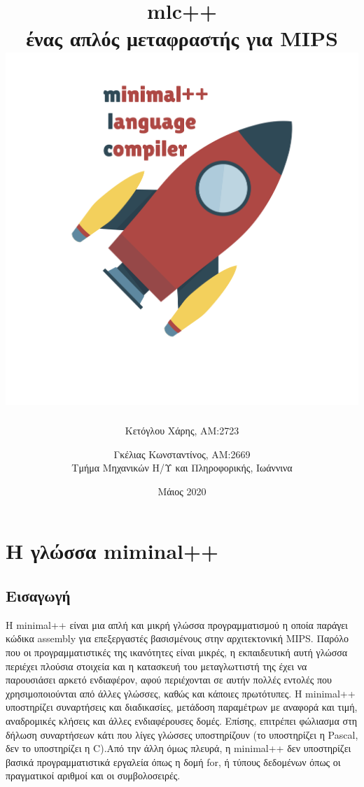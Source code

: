 \documentclass[12pt,a4paper,a4paper]{report}
\begin{document}
\title{mlc++\\ ένας απλός μεταφραστής για MIPS \\ \includegraphics[scale=0.3]{logo}}
\author{Κετόγλου Χάρης, ΑΜ:2723 \and Γκέλιας Κωνσταντίνος, ΑΜ:2669 \\{Τμήμα Μηχανικών Η/Υ και Πληροφορικής, Ιωάννινα}}
\date{Μάιος 2020}
\maketitle
\tableofcontents

\chapter{Η γλώσσα miminal++}

\section{Εισαγωγή}
Η minimal++ είναι μια απλή και μικρή γλώσσα προγραμματισμού η οποία παράγει κώδικα assembly για επεξεργαστές βασισμένους στην αρχιτεκτονική MIPS. Παρόλο που οι προγραμματιστικές της ικανότητες είναι μικρές, η εκπαιδευτική αυτή γλώσσα περιέχει πλούσια στοιχεία και η κατασκευή του μεταγλωττιστή της έχει να παρουσιάσει αρκετό ενδιαφέρον, αφού περιέχονται σε αυτήν πολλές εντολές που χρησιμοποιούνται από άλλες γλώσσες, καθώς και κάποιες πρωτότυπες. Η minimal++ υποστηρίζει συναρτήσεις και διαδικασίες, μετάδοση   παραμέτρων με αναφορά και τιμή, αναδρομικές κλήσεις και άλλες ενδιαφέρουσες δομές. Επίσης, επιτρέπει φώλιασμα στη δήλωση συναρτήσεων κάτι που λίγες γλώσσες υποστηρίζουν (το υποστηρίζει η Pascal, δεν το υποστηρίζει η C).Από την άλλη όμως πλευρά, η minimal++ δεν υποστηρίζει βασικά προγραμματιστικά εργαλεία όπως η δομή for, ή τύπους δεδομένων όπως οι πραγματικοί αριθμοί και οι συμβολοσειρές.
\end{document}
